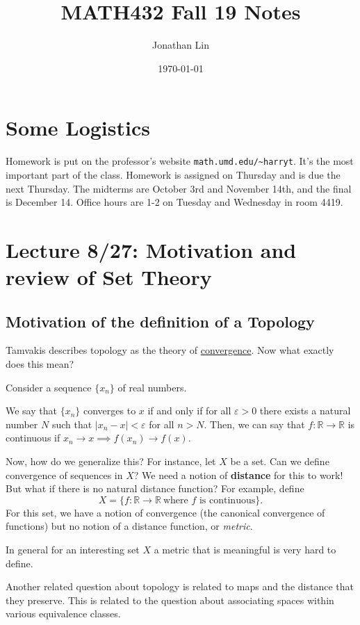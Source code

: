 \documentclass[12pt]{article}
\title{MATH432 Fall 19 Notes}
\author{Jonathan Lin}
\date{\today}
\theoremstyle{plain}
\theoremstyle{definition}
\newcommand{\ve}{\varepsilon}
\newcommand{\Real}{\mathbb{R}}
\begin{document}
\maketitle

\section{Some Logistics}
Homework is put on the professor's website \verb|math.umd.edu/~harryt|. It's the most important part of the class. Homework is assigned on Thursday and is due the next Thursday. The midterms are October 3rd and November 14th, and the final is December 14. Office hours are 1-2 on Tuesday and Wednesday in room 4419.

\section{Lecture 8/27: Motivation and review of Set Theory}

\subsection{Motivation of the definition of a Topology}

Tamvakis describes topology as the theory of \underline{convergence}. Now what exactly does this mean?

Consider a sequence $\{x_n\}$ of real numbers.

We say that $\{x_n\}$ converges to $x$ if and only if for all $\varepsilon > 0$ there exists a natural number $N$ such that $|x_n - x| < \ve$ for all $n > N$. Then, we can say that $f: \Real \to \Real$ is continuous if $x_n \to x \implies f(x_n) \to f(x)$.

Now, how do we generalize this? For instance, let $X$ be a set. Can we define convergence of sequences in $X$? We need a notion of \textbf{distance} for this to work! But what if there is no natural distance function? For example, define 
\[X = \{f: \Real \to \Real~\text{where }f\text{ is continuous}\}.\] 
For this set, we have a notion of convergence (the canonical convergence of functions) but no notion of a distance function, or \textit{metric}.

In general for an interesting set $X$ a metric that is meaningful is very hard to define.

Another related question about topology is related to maps and the distance that they preserve. This is related to the question about associating spaces within various equivalence classes.
\end{document}
